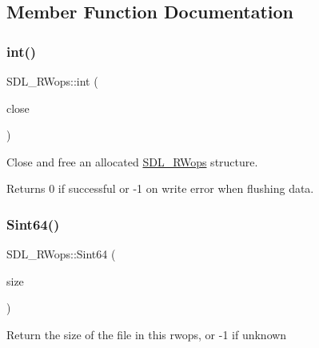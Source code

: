 \subsection{Member Function Documentation}
\mbox{\label{struct_s_d_l___r_wops_ab303bcbb0f6742a141ba8b2998923f47}} 
\subsubsection{\texorpdfstring{int()}{int()}}
{\footnotesize\ttfamily S\+D\+L\+\_\+\+R\+Wops\+::int (\begin{DoxyParamCaption}\item[{\hyperlink{begin__code_8h_a81faf4ba0455dc75f2e0507eddb79401}{S\+D\+L\+C\+A\+LL} $\ast$}]{close }\end{DoxyParamCaption})}

Close and free an allocated \hyperlink{struct_s_d_l___r_wops}{S\+D\+L\+\_\+\+R\+Wops} structure.

\begin{DoxyReturn}{Returns}
0 if successful or -\/1 on write error when flushing data. 
\end{DoxyReturn}
\mbox{\label{struct_s_d_l___r_wops_a45f66dbb683a88281d96f83ca18c525f}} 
\subsubsection{\texorpdfstring{Sint64()}{Sint64()}\hspace{0.1cm}{\footnotesize\ttfamily [1/2]}}
{\footnotesize\ttfamily S\+D\+L\+\_\+\+R\+Wops\+::\+Sint64 (\begin{DoxyParamCaption}\item[{\hyperlink{begin__code_8h_a81faf4ba0455dc75f2e0507eddb79401}{S\+D\+L\+C\+A\+LL} $\ast$}]{size }\end{DoxyParamCaption})}

Return the size of the file in this rwops, or -\/1 if unknown \mbox{\label{struct_s_d_l___r_wops_a767114391a3d1b4a7c214da3e164acf5}} 
